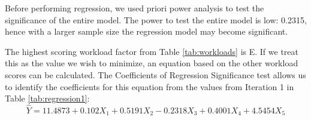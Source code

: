 \documentclass[thesis]{fputhesis}
\begin{document}
\begin{body}
Before performing regression, we used priori power analysis to test the significance of the entire model. The power to test the entire model is low: 0.2315, hence with a larger sample size the regression model may become significant.

The highest scoring workload factor from Table \ref{tab:workloads} is E. If we treat this as the value we wish to minimize, an equation based on the other workload scores can be calculated. The Coefficients of Regression Significance test allows us to identify the coefficients for this equation from the values from Iteration 1 in Table \ref{tab:regression1}:
\begin{equation}
    \label{eqn:regression11}
    \hat{Y} = 11.4873 + 0.102X_1 + 0.5191X_2 - 0.2318X_3 + 0.4001X_4 + 4.5454X_5
\end{equation}


\end{body}
\end{document}
